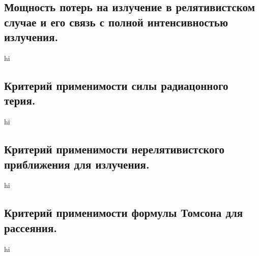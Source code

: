 \documentclass[a4paper,12pt]{article}
\begin{document}
\subsection{Мощность потерь на излучение в релятивистском случае и его связь
с полной интенсивностью излучения.}
hi
\subsection{Критерий применимости силы радиацонного терия.}
hi
\subsection{Критерий применимости нерелятивистского приближения для излучения.}
hi
\subsection{Критерий применимости формулы Томсона для рассеяния.}
hi
\end{document}
